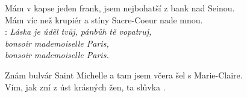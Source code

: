 
Mám v kapse jeden frank, jsem nejbohatší z bank nad Seinou.\\
Mám víc než krupiér a stíny Sacre-Coeur nade mnou.\\

\textregistered:
\emph{
Láska je úděl tvůj, pánbůh tě vopatruj,\\
bonsoir mademoiselle Paris,\\
bonsoir mademoiselle Paris.\\
}

Znám bulvár Saint Michelle a tam jsem včera šel s Marie-Claire.\\
Vím, jak zní z úst krásných žen, ta slůvka .\\

\textregistered \textregistered

\newpage

